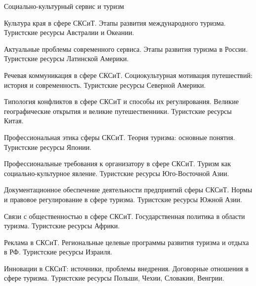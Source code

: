 \documentclass[
	11pt,
	a4paper,
	]
	{article}
\begin{document}
 {Социально-культурный сервис и туризм}

	

\noindent{} 
	{
		Культура края в сфере СКСиТ.
	}{
		Этапы развития международного туризма.
	}{
		Туристские ресурсы Австралии и Океании.
	}

\bigskip

\noindent{} 
	{
		Актуальные проблемы современного сервиса.
	}{
		Этапы развития туризма в России.
	}{
		Туристские ресурсы Латинской Америки.
	}

\bigskip

\noindent{} 
	{
		Речевая коммуникация в сфере СКСиТ.
	}{
		Социокультурная мотивация путешествий: история и современность.
	}{
		Туристские ресурсы Северной Америки.
	}

\bigskip

\noindent{} 
	{
		Типология конфликтов в сфере СКСиТ и способы их регулирования.
	}{
		Великие географические открытия и великие путешественники.
	}{
		Туристские ресурсы Китая.
	}

\bigskip

\noindent{} 
	{
		Профессиональная этика сферы СКСиТ.
	}{
		Теория туризма: основные понятия.
	}{
		Туристские ресурсы Японии.
	}

\bigskip

\noindent{} 
	{
		Профессиональные требования к организатору в сфере СКСиТ.
	}{
		Туризм как социально-культурное явление.
	}{
		Туристские ресурсы Юго-Восточной Азии.
	}

\bigskip

\noindent{} 
	{
		Документационное обеспечение деятельности предприятий сферы СКСиТ.
	}{
		Нормы и правовое регулирование в сфере туризма.
	}{
		Туристские ресурсы Южной Азии.
	}

\bigskip

\noindent{} 
	{
		Связи с общественностью в сфере СКСиТ.
	}{
		Государственная политика в области туризма.
	}{
		Туристские ресурсы Африки.
	}

\bigskip

\noindent{} 
	{
		Реклама в СКСиТ.
	}{
		Региональные целевые программы развития туризма и отдыха в РФ.
	}{
		Туристские ресурсы Израиля.
	}

\bigskip

\noindent{} 
	{
		Инновации в СКСиТ: источники, проблемы внедрения.
	}{
		Договорные отношения в сфере туризма.
	}{
		Туристские ресурсы Польши, Чехии, Словакии, Венгрии.
	}
\end{document}
